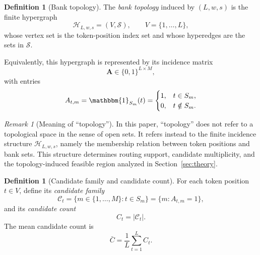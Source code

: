 \documentclass{article}
\theoremstyle{plain}
\theoremstyle{definition}
\newtheorem{definition}[theorem]{Definition}
\theoremstyle{remark}
\newtheorem{remark}[theorem]{Remark}
\begin{document}
\begin{definition}[Bank topology]
\label{def:bank-topology}
The \emph{bank topology} induced by $(L,w,s)$ is the finite hypergraph
\begin{equation}
\label{eq:bank-topology}
\mathcal{H}_{L,w,s}=(V,\mathcal S),
\qquad
V=\{1,\dots,L\},
\end{equation}
whose vertex set is the token-position index set and whose hyperedges are the sets in $\mathcal S$.

Equivalently, this hypergraph is represented by its incidence matrix
\begin{equation}
\label{eq:incidence-matrix}
\mathbf A\in\{0,1\}^{L\times M},
\end{equation}
with entries
\begin{equation}
\label{eq:incidence-entry}
A_{t,m}=\mathbbm{1}_{S_m}(t)=
\begin{cases}
1,& t\in S_m,\\
0,& t\notin S_m.
\end{cases}
\end{equation}
\end{definition}

\begin{remark}[Meaning of ``topology'']
\label{rem:topology-meaning}
In this paper, ``topology'' does not refer to a topological space in the sense of open sets. It refers instead to the finite incidence structure $\mathcal H_{L,w,s}$, namely the membership relation between token positions and bank sets. This structure determines routing support, candidate multiplicity, and the topology-induced feasible region analyzed in Section~\ref{sec:theory}.
\end{remark}

\begin{definition}[Candidate family and candidate count]
\label{def:candidate-family}
For each token position $t\in V$, define its \emph{candidate family}
\begin{equation}
\label{eq:candidate-family}
\mathcal C_t=\{m\in\{1,\dots,M\}: t\in S_m\}
=\{m:A_{t,m}=1\},
\end{equation}
and its \emph{candidate count}
\begin{equation}
\label{eq:candidate-count}
C_t=|\mathcal C_t|.
\end{equation}
The mean candidate count is
\begin{equation}
\label{eq:mean-candidate-count}
\bar C=\frac{1}{L}\sum_{t=1}^L C_t.
\end{equation}
\end{definition}
\end{document}
